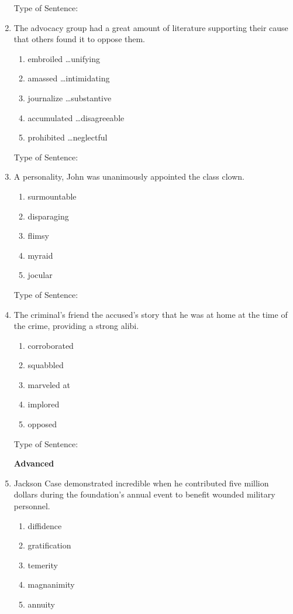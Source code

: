 \begin{enumerate}
Type of Sentence:\hrulefill

\bigskip
\item The advocacy group had \longline a great amount of literature supporting their cause that others found it \longline to oppose them. 
\begin{enumerate}[label=(\Alph*)]
\item embroiled \ldots unifying
\item amassed \ldots intimidating 
\item journalize \ldots substantive
\item accumulated \ldots disagreeable
\item prohibited \ldots neglectful
\end{enumerate}

Type of Sentence:\hrulefill

\bigskip
\item A \longline personality, John was unanimously appointed the class clown. 
\begin{enumerate}[label=(\Alph*)]
\item surmountable
\item disparaging
\item flimsy
\item myraid 
\item jocular
\end{enumerate}

Type of Sentence:\hrulefill

\bigskip
\item The criminal's friend \longline the accused's story that he was at home at the time of the crime, providing a strong alibi. 
\begin{enumerate}[label=(\Alph*)]
\item corroborated 
\item squabbled
\item marveled at
\item implored
\item opposed
\end{enumerate}

Type of Sentence:\hrulefill

\textbf{Advanced}

\bigskip
\item Jackson Case demonstrated incredible \longline when he contributed five million dollars during the foundation's annual event to benefit wounded military personnel. 
\begin{enumerate}[label=(\Alph*)]
\item diffidence 
\item gratification
\item temerity
\item magnanimity 
\item annuity 
\end{enumerate}


\end{enumerate}
